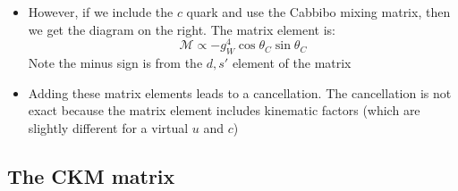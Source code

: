 \documentclass[11pt]{article}
\newcommand{\Mme}{\mathcal{M}}
\begin{document}
\begin{itemize}
\begin{itemize}
    \item However, if we include the $c$ quark and use the Cabbibo mixing matrix, then we get the diagram on the right. The matrix element is:
    \begin{equation}
      \Mme \propto -g_W^4\cos\theta_C\sin\theta_C
    \end{equation}
    Note the minus sign is from the $d,s'$ element of the matrix
    \item Adding these matrix elements leads to a cancellation. The cancellation is not exact because the matrix element includes kinematic factors (which are slightly different for a virtual $u$ and $c$)
  \end{itemize}
\end{itemize}

  \subsection{The CKM matrix}
\end{document}
